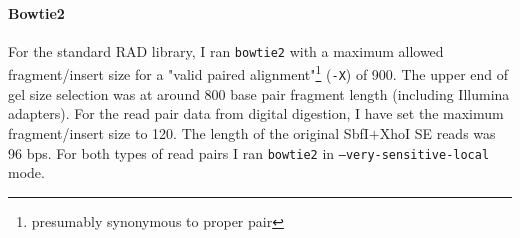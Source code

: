 \documentclass[a4paper,12pt,times,print,index,custombib,custommargin]{PhDThesisPSnPDF}\usepackage[]{graphicx}\usepackage[]{color}
\begin{document}
%
%
%

\paragraph{Bowtie2}
For the standard RAD library, I ran \texttt{bowtie2} with a maximum allowed fragment/insert size for a "valid paired alignment"\footnote{presumably synonymous to \gls{proper pair}} (\texttt{-X}) of 900. The upper end of gel size selection was at around 800 base pair fragment length (including Illumina adapters). For the read pair data from digital digestion,  I have set the maximum fragment/insert size to 120. The length of the original SbfI$+$XhoI SE reads was 96 \glspl{bp}. For both types of read pairs I ran \texttt{bowtie2} in \texttt{--very-sensitive-local} mode.

%
%
%
\end{document}
